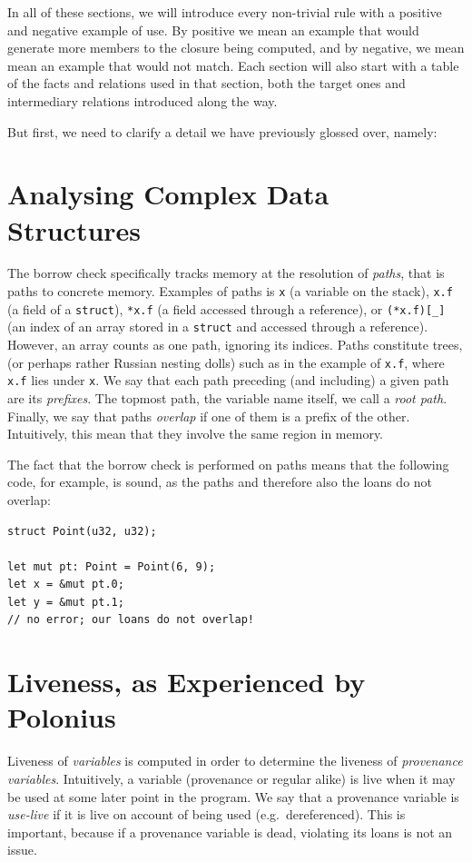 \documentclass[11pt,a4paper,twoside,openany,draft]{report}
\newcommand{\InRust}[1]{\texttt{#1}}
\begin{document}
In all of these sections, we will introduce every non-trivial rule with a
positive and negative example of use. By positive we mean an example that would
generate more members to the closure being computed, and by negative, we mean
mean an example that would not match. Each section will also start with a table
of the facts and relations used in that section, both the target ones and
intermediary relations introduced along the way.

But first, we need to clarify a detail we have previously glossed over, namely:

\section{Analysing Complex Data Structures}\label{sec:paths}

The borrow check specifically tracks memory at the resolution of \textit{paths},
that is paths to concrete memory. Examples of paths is \InRust{x} (a variable on
the stack), \InRust{x.f} (a field of a \InRust{struct}), \InRust{*x.f} (a field
accessed through a reference), or \InRust{(*x.f)[_]} (an index of an array
stored in a \InRust{struct} and accessed through a reference). However, an array
counts as one path, ignoring its indices. Paths constitute trees, (or perhaps
rather Russian nesting dolls) such as in the example of \InRust{x.f}, where
\InRust{x.f} lies under \InRust{x}. We say that each path preceding (and
including) a given path are its \textit{prefixes}. The topmost path, the
variable name itself, we call a \textit{root path}. Finally, we say that paths
\textit{overlap} if one of them is a prefix of the other. Intuitively, this mean
that they involve the same region in memory.


The fact that the borrow check is performed on paths means that the following
code, for example, is sound, as the paths and therefore also the loans do not
overlap:
\begin{verbatim}
struct Point(u32, u32);

let mut pt: Point = Point(6, 9);
let x = &mut pt.0;
let y = &mut pt.1;
// no error; our loans do not overlap!
\end{verbatim}

\section{Liveness, as Experienced by Polonius}\label{sec:liveness}

Liveness of \emph{variables} is computed in order to determine the liveness of
\emph{provenance variables}. Intuitively, a variable (provenance or regular
alike) is live when it may be used at some later point in the program. We say
that a provenance variable is \textit{use-live} if it is live on account of
being used (e.g.\ dereferenced). This is important, because if a provenance
variable is dead, violating its loans is not an issue.
\end{document}
